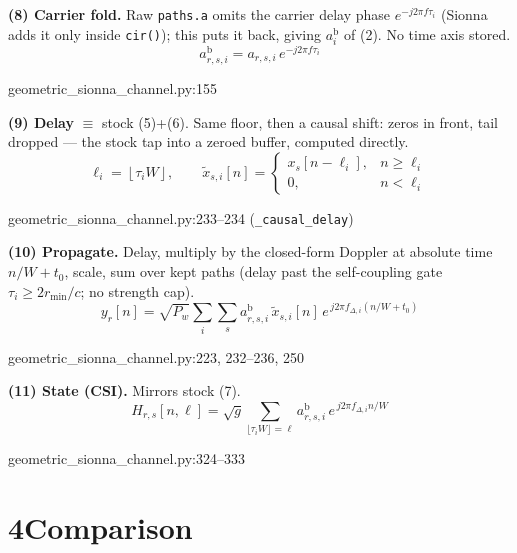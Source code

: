 \documentclass[11pt]{article}
\newcommand{\ab}{a^{\mathrm{b}}}
\newcommand{\src}[1]{{\footnotesize\ttfamily #1}}
\newcommand{\eqsrc}[1]{\par\vspace{-4pt}\hfill\src{#1}\par\vspace{2pt}}
\newcommand{\flr}[1]{\left\lfloor #1 \right\rfloor}
\begin{document}
\textbf{(8) Carrier fold.} Raw \texttt{paths.a} omits the carrier delay phase $e^{-j2\pi f\tau_i}$
(Sionna adds it only inside \texttt{cir()}); this puts it back, giving $\ab_i$ of (2). No time axis stored.
\begin{equation}
\ab_{r,s,i} = a_{r,s,i}\,e^{-j2\pi f\tau_i}
\end{equation}
\eqsrc{geometric\_sionna\_channel.py:155}

\textbf{(9) Delay} $\equiv$ stock (5)+(6). Same floor, then a causal shift: zeros in front, tail dropped
--- the stock tap into a zeroed buffer, computed directly.
\begin{equation}
\ell_i = \flr{\tau_i W},\qquad
\tilde x_{s,i}[n] = \begin{cases} x_s[n-\ell_i], & n\ge \ell_i\\[2pt] 0, & n<\ell_i \end{cases}
\end{equation}
\eqsrc{geometric\_sionna\_channel.py:233--234 (\texttt{\_causal\_delay})}

\textbf{(10) Propagate.} Delay, multiply by the closed-form Doppler at absolute time $n/W+t_0$, scale,
sum over kept paths (delay past the self-coupling gate $\tau_i\ge 2r_{\min}/c$; no strength cap).
\begin{equation}
y_r[n] = \sqrt{P_w}\sum_i\sum_s \ab_{r,s,i}\,\tilde x_{s,i}[n]\,e^{\,j2\pi f_{\Delta,i}(n/W+t_0)}
\end{equation}
\eqsrc{geometric\_sionna\_channel.py:223, 232--236, 250}

\textbf{(11) State (CSI).} Mirrors stock (7).
\begin{equation}
H_{r,s}[n,\ell] = \sqrt{g}\!\!\sum_{\lfloor\tau_i W\rfloor=\ell}\!\! \ab_{r,s,i}\,e^{\,j2\pi f_{\Delta,i}n/W}
\end{equation}
\eqsrc{geometric\_sionna\_channel.py:324--333}

\section*{4\quad Comparison}
\end{document}
